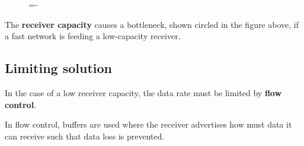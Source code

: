 \documentclass[a4paper]{systems-software}
\begin{document}
\begin{figure}[H]
	\lineskip=-\fboxrule
\end{figure}

The \textbf{receiver capacity} causes a bottleneck, shown circled in the figure above, if a fast network is feeding a low-capacity receiver.


\subsection*{Limiting solution}

In the case of a low receiver capacity, the data rate must be limited by \textbf{flow control}.

In flow control, buffers are used where the receiver advertises how must data it can receive such that data loss is prevented.
\end{document}
